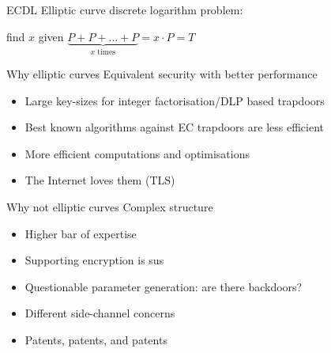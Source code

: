 \begin{frame}{ECDL}
  Elliptic curve discrete logarithm problem:
  \begin{center}
    find $x$ given $\underbrace{P + P + \dots + P}_{x \text{ times}} = x\cdot P = T$
  \end{center}
\end{frame}

\iffalse
\begin{frame}{Elliptic curve cryptography}
  \begin{tikzpicture}
    \begin{axis}[
            xmin=-4,
            xmax=5,
            ymin=-5,
            ymax=5,
            xlabel={$x$},
            ylabel={$y$},
            scale only axis,
            axis lines=middle,
            domain=-2.279018:3,      
            samples=201,
            smooth,   
            clip=false,
            axis equal image=true,
        ]
    
    \addplot[blue] {sqrt(x^3-3*x+5)} node[right] {$E$};
    \addplot[blue] {-sqrt(x^3-3*x+5)};
    \addplot[red] {2.621+0.251*(x+1.2)};
    
    
        \draw [fill=black] (axis cs:-1.2,2.6) circle (2pt);
        \draw[color=black] (axis cs:-1.4,2.7) node [left]{$P$};
    \end{axis}
    \end{tikzpicture}
\end{frame}
\fi

\begin{frame}{Why elliptic curves}
  Equivalent security with better performance
  \begin{itemize}[<+(1)->]
    \item Large key-sizes for integer factorisation/DLP based trapdoors
    \item Best known algorithms against EC trapdoors are less efficient
    \item More efficient computations and optimisations
    \item The Internet loves them (TLS)
  \end{itemize}
\end{frame}

\begin{frame}{Why not elliptic curves}
  Complex structure
  \begin{itemize}[<+(1)->]
    \item Higher bar of expertise
    \item Supporting encryption is sus
    \item Questionable parameter generation: are there backdoors?
    \item Different side-channel concerns
    \item Patents, patents, and patents
  \end{itemize}
\end{frame}

